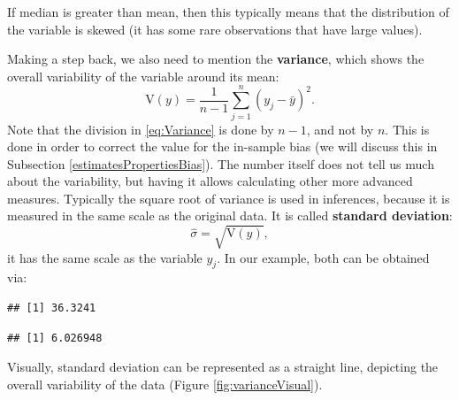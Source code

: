 \documentclass[
]{book}
\newenvironment{Shaded}{\begin{snugshade}}{\end{snugshade}}
\newcommand{\FunctionTok}[1]{\textcolor[rgb]{0.13,0.29,0.53}{\textbf{#1}}}
\newcommand{\NormalTok}[1]{#1}
\newcommand{\SpecialCharTok}[1]{\textcolor[rgb]{0.81,0.36,0.00}{\textbf{#1}}}
\theoremstyle{definition}
\theoremstyle{definition}
\theoremstyle{definition}
\theoremstyle{definition}
\theoremstyle{remark}
\begin{document}
If median is greater than mean, then this typically means that the distribution of the variable is skewed (it has some rare observations that have large values).

Making a step back, we also need to mention the \textbf{variance}, which shows the overall variability of the variable around its mean:
\begin{equation}
    \mathrm{V}(y)= \frac{1}{n-1}\sum_{j=1}^n (y_j - \bar{y})^2 .
    \label{eq:Variance}
\end{equation}
Note that the division in \eqref{eq:Variance} is done by \(n-1\), and not by \(n\). This is done in order to correct the value for the in-sample bias (we will discuss this in Subsection \ref{estimatesPropertiesBias}). The number itself does not tell us much about the variability, but having it allows calculating other more advanced measures. Typically the square root of variance is used in inferences, because it is measured in the same scale as the original data. It is called \textbf{standard deviation}:
\begin{equation}
    \hat{\sigma} = \sqrt{\mathrm{V}(y)} ,
    \label{eq:StdDev}
\end{equation}
it has the same scale as the variable \(y_j\). In our example, both can be obtained via:

\begin{Shaded}
\end{Shaded}

\begin{verbatim}
## [1] 36.3241
\end{verbatim}

\begin{Shaded}
\end{Shaded}

\begin{verbatim}
## [1] 6.026948
\end{verbatim}

Visually, standard deviation can be represented as a straight line, depicting the overall variability of the data (Figure \ref{fig:varianceVisual}).
\end{document}
